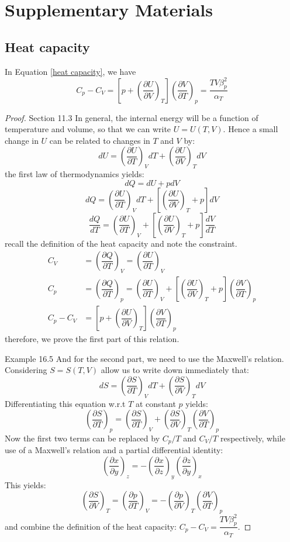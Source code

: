\documentclass[UTF8]{book}
\begin{document}
\chapter{Supplementary Materials}
\section{Heat capacity}
In Equation \ref{heat capacity}, we have
$$C_p-C_V=\left[p+\left(\dfrac{\partial U}{\partial V}\right)_T\right]\left(\dfrac{\partial V}{\partial T}\right)_p=\dfrac{TV\beta _p^2}{\alpha _T }$$
\begin{proof}
\textsf{Section 11.3 \cite{blundell2009concepts}} {In general, the internal energy will be a function of temperature and volume, so that we can write $U=U(T,V)$. Hence a small change in $U$ can be related to changes in $T$ and $V$ by:}
$$dU=\left(\dfrac{\partial U}{\partial T}\right)_VdT+\left(\dfrac{\partial U}{\partial V}\right)_TdV$$
 {the first law of thermodynamics yields:}
$$dQ=dU+pdV$$
$$dQ=\left(\dfrac{\partial U}{\partial T}\right)_VdT+\left[\left(\dfrac{\partial U}{\partial V}\right)_T+p\right]dV$$
$$\dfrac{dQ}{dT}=\left(\dfrac{\partial U}{\partial T}\right)_V+\left[\left(\dfrac{\partial U}{\partial V}\right)_T+p\right]\dfrac{dV}{dT}$$
recall the definition of the heat capacity and note the constraint.
\begin{align*}
C_V&=\left(\dfrac{\partial Q}{\partial T}\right)_V=\left(\dfrac{\partial U}{\partial T}\right)_V\\
C_p&=\left(\dfrac{\partial Q}{\partial T}\right)_p=\left(\dfrac{\partial U}{\partial T}\right)_V+\left[\left(\dfrac{\partial U}{\partial V}\right)_T+p\right]\left(\dfrac{\partial V}{\partial T}\right)_p\\
C_p-C_V&=\left[p+\left(\dfrac{\partial U}{\partial V}\right)_T\right]\left(\dfrac{\partial V}{\partial T}\right)_p
\end{align*}
therefore, we prove the first part of this relation. 
 
\textsf{Example 16.5 \cite{blundell2009concepts}}
And for the second part, we need to use the Maxwell's relation. Considering $S=S(T,V)$ allow us to write down immediately that:
$$dS=\left(\dfrac{\partial S}{\partial T}\right)_VdT+\left(\dfrac{\partial S}{\partial V}\right)_TdV$$
Differentiating this equation w.r.t $T$ at constant $p$ yields:
$$\left(\dfrac{\partial S}{\partial T}\right)_p=\left(\dfrac{\partial S}{\partial T}\right)_V+\left(\dfrac{\partial S}{\partial V}\right)_T\left(\dfrac{\partial V}{\partial T}\right)_p$$
Now the first two terms can be replaced by $C_p/T$ and $C_V/T$ respectively, while use of a Maxwell's relation and a partial differential identity:
$$\left(\dfrac{\partial x}{\partial y}\right)_z=-\left(\dfrac{\partial x}{\partial z}\right)_y\left(\dfrac{\partial z}{\partial y}\right)_x$$
This yields:
\[\left(\dfrac{\partial S}{\partial V}\right)_T=\left(\dfrac{\partial p}{\partial T}\right)_V=-\left(\dfrac{\partial p}{\partial V}\right)_T\left(\dfrac{\partial V}{\partial T}\right)_p\]
and combine the definition of the heat capacity: $C_p-C_V=\dfrac{TV\beta _p^2}{\alpha _T }$.
\end{proof}



\printindex
\end{document}
